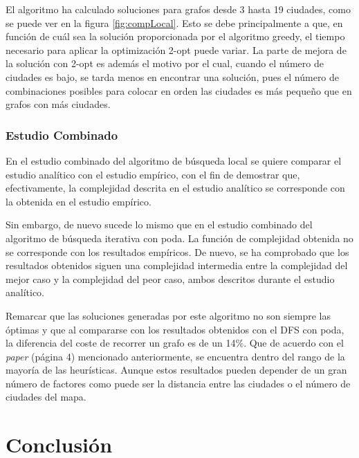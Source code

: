 \documentclass{uc3mpracticas}
\begin{document}
  \newpage
  El algoritmo ha calculado soluciones para grafos desde 3 hasta 19 ciudades, como se puede ver en la figura \ref{fig:compLocal}. Esto se debe principalmente a que, en función de cuál sea la solución proporcionada por el algoritmo greedy, el tiempo necesario para aplicar la optimización 2-opt puede variar. La parte de mejora de la solución con 2-opt es además el motivo por el cual, cuando el número de ciudades es bajo, se tarda menos en encontrar una solución, pues el número de combinaciones posibles para colocar en orden las ciudades es más pequeño que en grafos con más ciudades.






  \subsubsection{Estudio Combinado}

  En el estudio combinado del algoritmo de búsqueda local se quiere comparar el estudio analítico con el estudio empírico, con el fin de demostrar que, efectivamente, la complejidad descrita en el estudio analítico se corresponde con la obtenida en el estudio empírico.

  \vspace{2mm}

  Sin embargo, de nuevo sucede lo mismo que en el estudio combinado del algoritmo de búsqueda iterativa con poda. La función de complejidad obtenida no se corresponde con los resultados empíricos. De nuevo, se ha comprobado que los resultados obtenidos siguen una complejidad intermedia entre la complejidad del mejor caso y la complejidad del peor caso, ambos descritos durante el estudio analítico.

  \vspace{2mm}

  Remarcar que las soluciones generadas por este algoritmo no son siempre las óptimas y que al compararse con los resultados obtenidos con el DFS con poda, la diferencia del coste de recorrer un grafo es de un 14\%. Que de acuerdo con el \textit{paper} \cite{tsp} (página 4) mencionado anteriormente, se encuentra dentro del rango de la mayoría de las heurísticas. Aunque estos resultados pueden depender de un gran número de factores como puede ser la distancia entre las ciudades o el número de ciudades del mapa.



  \clearpage

  \section{Conclusión}
\end{document}
